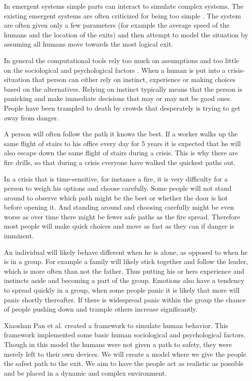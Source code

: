 In emergent systems simple parts can interact to simulate complex systems. The existing emergent systems  
are often criticized for being too simple \cite{simple}. The system are often given only a few parameters (for example the  
average speed of the humans and the location of the exits) and then attempt to model the situation by  
assuming all humans move towards the most logical exit. 
 
In general the computational tools rely too much on assumptions and too little on the sociological and psychological  
factors \cite{simple}. When a human is put into a crisis-situation that person can either rely on instinct, experience or making  
choices based on the alternatives. Relying on instinct typically means that the person is panicking and make immediate  
decisions that may or may not be good ones. People have been trampled to death by crowds that desperately is trying  
to get away from danger. 
 
A person will often follow the path it knows the best. If a worker walks up the same flight of stairs to his office  
every day for 5 years it is expected that he will also escape down the same flight of stairs during a crisis. This  
is why there are fire drills, so that during a crisis everyone have walked the quickest paths out. 
 
In a crisis that is time-sensitive, for instance a fire, it is very difficulty for a person to weigh his options and  
choose carefully. Some people will not stand around to observe which path might be the best or whether the  
door is hot before opening it. And standing around and choosing carefully might be even worse as  
over time there might be fewer safe paths as the fire spread. Therefore most people will make quick choices 
and move as fast as they can if danger is imminent. 
 
An individual will likely behave different when he is alone, as opposed to when he is in a group. For example  
a family will likely stick together \cite{Yang2005411} and follow the leader, which is more often than not the father. Thus putting  
his or hers experience and instincts aside and becoming a part of the group. Emotions also have a tendency  
to spread quickly in a group, when some people panic it is likely that more will panic shortly thereafter. If  
there is widespread panic within the group the chance of people pushing down and trample others increase  
significantly. 
 
Xiaoshan Pan et al.\cite{Pan:2007} created a framework to simulate human behavior. This framework implemented some 
basic human sociological and psychological factors. Though in this model the humans were not given a path 
to safety, they were merely left to their own devices. We will create a model where we give the people the 
safest path to the exit. We aim to have the people act as realistic as possible and be placed in a dynamic 
and complex environment.


